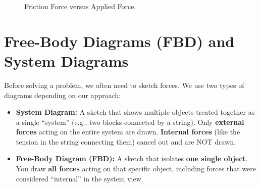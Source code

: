 \documentclass{article}
\begin{document}
\begin{figure}[h]
    \centering
    \caption{Friction Force versus Applied Force.}
\end{figure}

\newpage

\section{Free-Body Diagrams (FBD) and System Diagrams}

Before solving a problem, we often need to sketch forces. We use two types of diagrams depending on our approach:
\begin{itemize}
    \item \textbf{System Diagram:} A sketch that shows multiple objects treated together as a single ``system'' (e.g., two blocks connected by a string). Only \textbf{external forces} acting on the entire system are drawn. \textbf{Internal forces} (like the tension in the string connecting them) cancel out and are NOT drawn.
    \item \textbf{Free-Body Diagram (FBD):} A sketch that isolates \textbf{one single object}. You draw \textbf{all forces} acting on that specific object, including forces that were considered ``internal'' in the system view.
\end{itemize}
\end{document}
